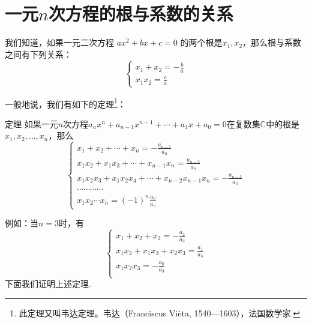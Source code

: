 \begin{ex}
\begin{enumerate}
\end{enumerate}
\end{ex}

\section{一元$n$次方程的根与系数的关系}
我们知道，如果一元二次方程
$ax^2+bx+c=0$
的两个根是$x_1,x_2$，那么根与系数之间有下列关系：
\[\begin{cases}
    x_1+x_2=-\frac{b}{a}\\
    x_1x_2=\frac{c}{a}
\end{cases}\]

一般地说，我们有如下的定理\footnote{此定理又叫韦达定理。韦达（Franciscus Vi\`{e}ta, 1540—1603），法国数学家.}：

\begin{thm}{定理}
如果一元$n$次方程$a_nx^n+a_{n-1}x^{n-1}+\cdots+a_1 x+a_0=0$在复数集$\mathbb{C}$中的根是$x_1,x_2,\ldots, x_n$，那么
\begin{equation}
\begin{cases}
x_1+x_2+\cdots+x_n=-\frac{a_{n-1}}{a_n}\\
x_1x_2+x_1x_3+\cdots+x_{n-1}x_n=\frac{a_{n-2}}{a_n}\\
x_1x_2x_3+x_1x_2x_4+\cdots+x_{n-2}x_{n-1}x_n=-\frac{a_{n-3}}{a_n}\\
\cdots\cdots\cdots\cdots\\
x_1x_2\cdots x_n=(-1)^n \frac{a_0}{a_n}
\end{cases}    \tag{*}
\end{equation}
\end{thm}

例如：当$n=3$时，有
\[\begin{cases}
    x_1+x_2+x_3=-\frac{a_2}{a_3}\\
    x_1x_2+x_1x_3+x_2x_3=\frac{a_1}{a_3}\\
    x_1x_2x_3=-\frac{a_0}{a_3}\\
\end{cases}\]
下面我们证明上述定理.

